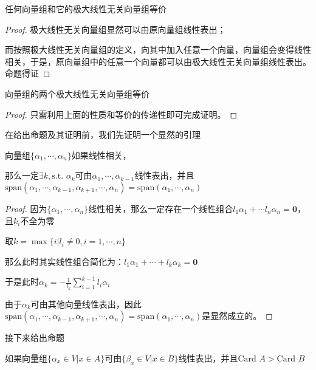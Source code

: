 \documentclass[12pt, a4paper, oneside, UTF8]{ctexbook}
\begin{document}
			\begin{para}{0}
					\begin{proposition}
						任何向量组和它的极大线性无关向量组等价
					\end{proposition}
					\begin{proof}
						极大线性无关向量组显然可以由原向量组线性表出；

						而按照极大线性无关向量组的定义，向其中加入任意一个向量，向量组会变得线性相关，于是，原向量组中的任意一个向量都可以由极大线性无关向量组线性表出。命题得证
					\end{proof}
					\begin{proposition}
						向量组的两个极大线性无关向量组等价
					\end{proposition}
					\begin{proof}
						只需利用上面的性质和等价的传递性即可完成证明。
					\end{proof}
					在给出命题及其证明前，我们先证明一个显然的引理
					\begin{lemma}{}{}
						向量组$\{\alpha_1,\cdots,\alpha_n\}$如果线性相关，
						
						那么一定$\exists k,\text{s.t. }\alpha_k$可由$\alpha_1,\cdots,\alpha_{k-1}$线性表出，并且$\text{span}(\alpha_1,\cdots,\alpha_{k-1},\alpha_{k+1},\cdots,\alpha_n)=\text{span}(\alpha_1,\cdots,\alpha_n)$
					\end{lemma}
					\begin{proof}
						因为$\{\alpha_1,\cdots,\alpha_n\}$线性相关，那么一定存在一个线性组合$l_1\alpha_1+\cdots l_n\alpha_n=\mathbf{0}$，且$k_i$不全为零

						取$k=\max\{i|l_i \neq 0,i=1,\cdots,n\}$

						那么此时其实线性组合简化为：$l_1\alpha_1+\cdots+l_k\alpha_k = \mathbf{0}$

						于是此时$\alpha_k = -\frac{1}{l_k} \sum\limits_{i=1}^{k-1} l_i \alpha_i$

						由于$\alpha_k$可由其他向量线性表出，因此$\text{span}(\alpha_1,\cdots,\alpha_{k-1},\alpha_{k+1},\cdots,\alpha_n)=\text{span}(\alpha_1,\cdots,\alpha_n)$是显然成立的。
					\end{proof}
					接下来给出命题
					\begin{proposition}
						如果向量组$\{\alpha_x \in V| x \in A\}$可由$\{\beta_x \in V| x \in B\}$线性表出，并且$\text{Card } A > \text{Card }B$


\end{proposition}
\end{para}
\end{document}
